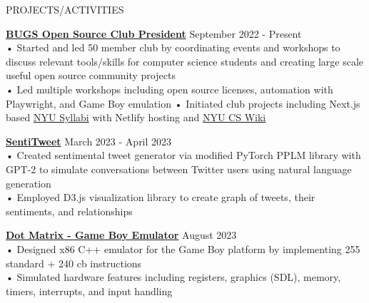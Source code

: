 \documentclass{resume} %
\begin{document}

% 


\begin{rSection}{PROJECTS/ACTIVITIES}

\textbf{\href{https://bugs-nyu.github.io/}{BUGS Open Source Club President}} \hfill September 2022 - Present \\
• Started and led 50 member club by coordinating events and workshops to discuss relevant tools/skills for computer science students and creating large scale useful open source community projects \\
• Led multiple workshops including open source licenses, automation with Playwright, and Game Boy emulation
• Initiated club projects including Next.js based \href{https://www.nyusyllabi.com}{NYU Syllabi} with Netlify hosting and \href{https://nyucswiki.com/}{NYU CS Wiki} 

\textbf {\href{https://github.com/aminoa/sentitweet/}{SentiTweet}} \hfill March 2023 - April 2023 \\
• Created sentimental tweet generator via modified PyTorch PPLM library with GPT-2 to simulate conversations between Twitter users using natural language generation\\
• Employed D3.js visualization library to create graph of tweets, their sentiments, and relationships 

\textbf{\href{https://github.com/aminoa/dot-matrix}{Dot Matrix - Game Boy Emulator}} \hfill August 2023 \\
• Designed x86 C++ emulator for the Game Boy platform by implementing 255 standard + 240 cb instructions \\
• Simulated hardware features including registers, graphics (SDL), memory, timers, interrupts, and input handling \newline


\end{rSection}
\end{document}
